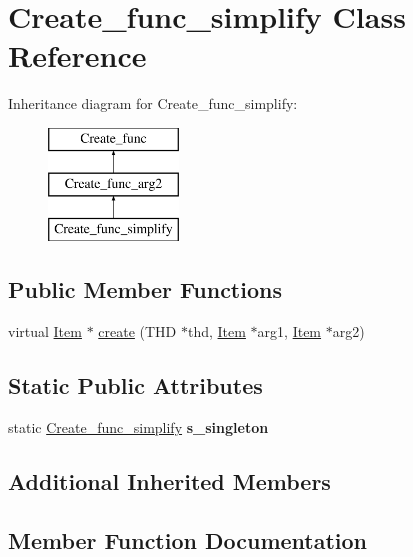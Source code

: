 \hypertarget{classCreate__func__simplify}{}\section{Create\+\_\+func\+\_\+simplify Class Reference}
\label{classCreate__func__simplify}
Inheritance diagram for Create\+\_\+func\+\_\+simplify\+:\begin{figure}[H]
\begin{center}
\leavevmode
\includegraphics[height=3.000000cm]{classCreate__func__simplify}
\end{center}
\end{figure}
\subsection*{Public Member Functions}
\begin{DoxyCompactItemize}
\item 
virtual \mbox{\hyperlink{classItem}{Item}} $\ast$ \mbox{\hyperlink{classCreate__func__simplify_a8dd39e0e04c6bf0b6228f39543e807aa}{create}} (T\+HD $\ast$thd, \mbox{\hyperlink{classItem}{Item}} $\ast$arg1, \mbox{\hyperlink{classItem}{Item}} $\ast$arg2)
\end{DoxyCompactItemize}
\subsection*{Static Public Attributes}
\begin{DoxyCompactItemize}
\item 
\mbox{\label{classCreate__func__simplify_a10ec507372baca7353197609cff3077e}} 
static \mbox{\hyperlink{classCreate__func__simplify}{Create\+\_\+func\+\_\+simplify}} {\bfseries s\+\_\+singleton}
\end{DoxyCompactItemize}
\subsection*{Additional Inherited Members}


\subsection{Member Function Documentation}
\mbox{\label{classCreate__func__simplify_a8dd39e0e04c6bf0b6228f39543e807aa}} 
